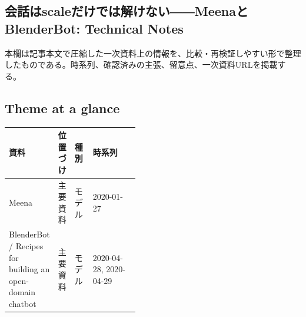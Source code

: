 \subsection*{会話はscaleだけでは解けない――MeenaとBlenderBot: Technical Notes}
本欄は記事本文で圧縮した一次資料上の情報を、比較・再検証しやすい形で整理したものである。時系列、確認済みの主張、留意点、一次資料URLを掲載する。
\smallskip
{}\par
\medskip
\subsection*{Theme at a glance}
\begin{center}
\footnotesize
\begin{tabularx}{\linewidth}{@{}p{0.20\linewidth}p{0.10\linewidth}p{0.14\linewidth}X@{}}
\toprule
資料 & 位置づけ & 種別 & 時系列 \\
\midrule
Meena & 主要資料 & モデル & 2020-01-27 \\
BlenderBot / Recipes for building an open-domain chatbot & 主要資料 & モデル & 2020-04-28, 2020-04-29 \\
\bottomrule
\end{tabularx}
\end{center}
\normalsize

